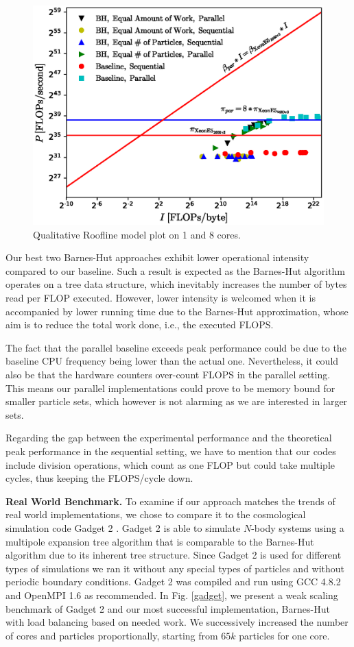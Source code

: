 \documentclass[letterpaper]{article}
\newcommand{\mypar}[1]{{\bf #1.}}
\begin{document}
\begin{figure}[h]
 \centering
 \includegraphics[scale=0.4]{figs/roofline.eps}
  \caption{Qualitative Roofline model plot on 1 and 8 cores.\label{roofline}}
\end{figure}

Our best two Barnes-Hut approaches exhibit lower operational intensity compared to our baseline. Such a result is expected as the Barnes-Hut algorithm operates on a tree data structure, which inevitably increases the number of bytes read per FLOP executed. However, lower intensity is welcomed when it is accompanied by lower running time due to the Barnes-Hut approximation, whose aim is to reduce the total work done, i.e., the executed FLOPS. 

The fact that the parallel baseline exceeds peak performance could be due to the baseline CPU frequency being lower than the actual one. Nevertheless, it could also be that the hardware counters over-count FLOPS in the parallel setting. This means our parallel implementations could prove to be memory bound for smaller particle sets, which however is not alarming as we are interested in larger sets.

Regarding the gap between the experimental performance and the theoretical peak performance in the sequential setting, we have to mention that our codes include division operations, which count as one FLOP but could take multiple cycles, thus keeping the FLOPS/cycle down.

\mypar{Real World Benchmark}
To examine if our approach matches the trends of real world implementations, we chose to compare it to the cosmological simulation code Gadget 2 \cite{gadget}. Gadget 2 is able to simulate $N$-body systems using a multipole expansion tree algorithm that is comparable to the Barnes-Hut algorithm due to its inherent tree structure. Since Gadget 2 is used for different types of simulations we ran it without any special types of particles and without periodic boundary conditions. Gadget 2 was compiled and run using GCC 4.8.2 and OpenMPI 1.6 as recommended. In Fig. \ref{gadget}, we present a weak scaling benchmark of Gadget 2 and our most successful implementation, Barnes-Hut with load balancing based on needed work. We successively increased the number of cores and particles proportionally, starting from $65k$ particles for one core.
\end{document}
